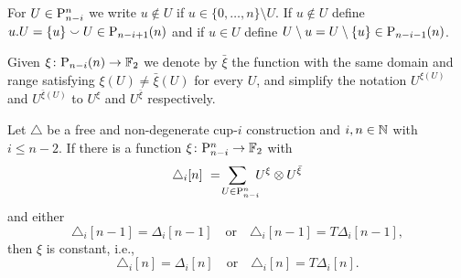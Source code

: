 
\begin{notation}
	For $U \in \P_{n-i}^n$ we write $u \notin U$ if $u \in \{0, \dots, n\} \setminus U$. If $u \notin U$ define $u.U = \{u\} \union U \in \P_{n-i+1}(n)$ and if $u \in U$ define $U \setminus u = U \setminus \{u\} \in \P_{n-i-1}(n)$.
\end{notation}

\begin{notation}
	Given $\xi \colon \P_{n-i}(n) \to \F$ we denote by $\bar{\xi}$ the function with the same domain and range satisfying $\xi(U) \neq \bar{\xi}(U)$ for every $U$, and simplify the notation $U^{\xi(U)}$ and $U^{\bar{\xi}(U)}$ to $U^\xi$ and $U^{\bar{\xi}}$ respectively.
\end{notation}

\begin{lemma} \label{l:first nail}
	Let $\triangle$ be a free and non-degenerate cup-$i$ construction and $i,n \in \N$ with $i \leq n-2$.
	If there is a function $\xi \colon \P_{n-i}^n \to \F$ with
	\begin{equation} \label{e:assumed identity with xi and barxi}
	\triangle_i [n] \ = \!
	\sum_{U \in \P_{n-i}^n \kern-5pt} U^{\xi} \ot U^{\barxi}
	\end{equation}
	and either
	\[
	\triangle_i [n-1] = \Delta_i [n-1]
	\quad \text{or} \quad
	\triangle_i [n-1] = T\Delta_i [n-1],
	\]
	then $\xi$ is constant, i.e.,
	\[
	\triangle_i [n] = \Delta_i [n]
	\quad \text{or} \quad
	\triangle_i [n] = T \Delta_i [n].
	\]
\end{lemma}

